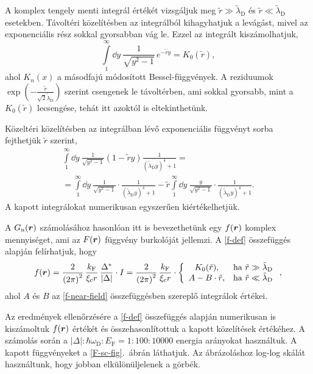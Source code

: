 \documentclass[a4paper,12pt,titlepage]{article}
\newcommand{\RR}{{\vb*{r}}}
\newcommand{\kF}{{k_\text{F}}}
\newcommand{\EF}{{E_\text{F}}}
\begin{document}
A komplex tengely menti integrál értékét vizsgáljuk meg $\tilde{r} \gg \tilde{\lambda}_\text{D}$ és $\tilde{r} \ll \tilde{\lambda}_\text{D}$ esetekben.  Távoltéri közelítésben az integrálból kihagyhatjuk a levágást, mivel az exponenciális rész sokkal gyorsabban vág le.  Ezzel az integrált kiszámolhatjuk,
\begin{equation}
	\int\limits_1^\infty \dd{y} ~ \frac{1}{\sqrt{y^2 - 1}} \, e^{-\tilde{r} y} = K_0(\tilde{r}),
\end{equation}
ahol $K_n(x)$ a másodfajú módosított Bessel-függvények.  A reziduumok $\exp(-\frac{\tilde{r}}{\sqrt{2} \tilde{\lambda}_\text{D}})$ szerint csengenek le távoltérben, ami sokkal gyorsabb, mint a $K_0(\tilde{r})$ lecsengése, tehát itt azoktól is eltekinthetünk.

Közeltéri közelítésben az integrálban lévő exponenciális függvényt sorba fejthetjük $\tilde{r}$ szerint,
\begin{multline} \label{f-near-field}
	\int\limits_1^\infty \dd{y} ~ \frac{1}{\sqrt{y^2 - 1}} \left( 1 - \tilde{r} y \right) \frac{1}{\left( \tilde{\lambda}_\text{D} y \right)^4 + 1} = \\
	= \int\limits_1^\infty \dd{y} ~ \frac{1}{\sqrt{y^2 - 1}} \cdot \frac{1}{\left( \tilde{\lambda}_\text{D} y \right)^4 + 1} - \tilde{r} \int\limits_1^\infty \dd{y} ~ \frac{y}{\sqrt{y^2 - 1}} \cdot \frac{1}{\left( \tilde{\lambda}_\text{D} y \right)^4 + 1}.
\end{multline}
A kapott integrálokat numerikusan egyszerűen kiértékelhetjük.

A $G_\text{n}(\RR)$ számolásához hasonlóan itt is bevezethetünk egy $f(\RR)$ komplex mennyiséget, ami az $F(\RR)$ függvény burkolóját jellemzi.  A \eqref{f-def} összefüggés alapján felírhatjuk, hogy
\begin{equation}
	f(\RR) = \frac{2}{\left( 2 \pi \right)^2} \, \frac{\kF}{\xi_\text{c} r} \, \frac{\Delta^*}{\left| \Delta \right|} \cdot I = \frac{2}{\left( 2 \pi \right)^2} \, \frac{\kF}{\xi_\text{c} r} \cdot \left\{ \begin{array}{cl}
		K_0(\tilde{r}), & \text{ha } \tilde{r} \gg \tilde{\lambda}_\text{D} \\
		A - B \cdot \tilde{r}, & \text{ha } \tilde{r} \ll \tilde{\lambda}_\text{D}
	\end{array} \right. ,
\end{equation}
ahol $A$ és $B$ az \eqref{f-near-field} összefüggésben szereplő integrálok értékei.

Az eredmények ellenőrzésére a \eqref{f-def} összefüggés alapján numerikusan is kiszámoltuk $f(\RR)$ értékét és összehasonlítottuk a kapott közelítések értékéhez.  A számolás során a $\left| \Delta \right| : \hbar \omega_\text{D} : \EF = 1 : 100 : 10000$ energia arányokat használtuk.  A kapott függvényeket a \ref{F-sc-fig}.\ ábrán láthatjuk.  Az ábrázoláshoz log-log skálát használtunk, hogy jobban elkülönüljelenek a görbék.
\end{document}
